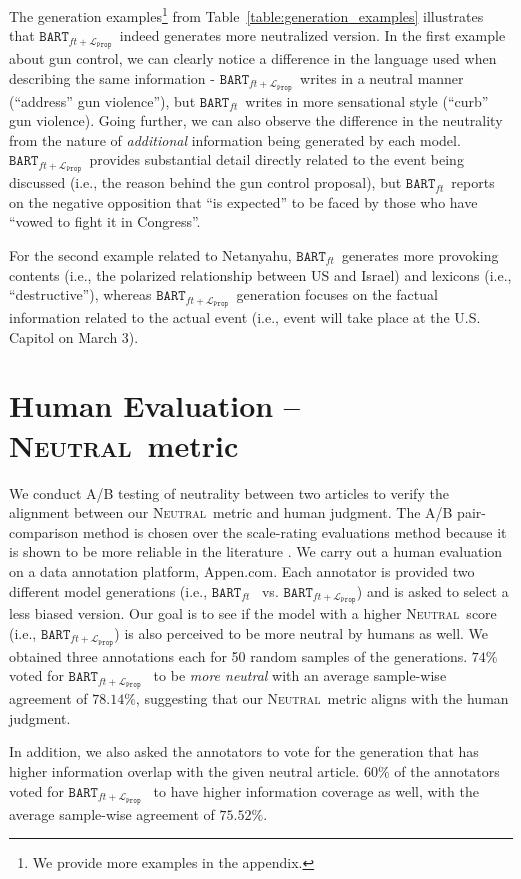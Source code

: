 \documentclass[11pt,a4paper]{article}
\newcommand{\neutral}{\textsc{Neutral}}
\newcommand{\finetune}{$\texttt{BART}_{ft}$}
\newcommand{\prop}{$\texttt{BART}_{ft+\mathcal{L}_\texttt{Prop}}$}
\begin{document}
The generation examples\footnote{We provide more examples in the appendix.} from Table~\ref{table:generation_examples} illustrates that \prop~indeed generates more neutralized version. 
In the first example about gun control, we can clearly notice a difference in the language used when describing the same information - \prop~writes in a neutral manner (``address'' gun violence''), but \finetune~writes in more sensational style (``curb'' gun violence). Going further, we can also observe the difference in the neutrality from the nature of \textit{additional} information being generated by each model. \prop~provides substantial detail directly related to the event being discussed (i.e., the reason behind the gun control proposal), but \finetune~reports on the negative opposition that ``is expected'' to be faced by those who have ``vowed to fight it in Congress''. 

For the second example related to Netanyahu, \finetune~generates more provoking contents (i.e., the polarized relationship between US and Israel) and lexicons (i.e., ``destructive''), whereas \prop~generation focuses on the factual information related to the actual event (i.e., event will take place at the U.S. Capitol on March 3).

\section{Human Evaluation -- \neutral~metric}
We conduct A/B testing of neutrality between two articles to verify the alignment between our \neutral~metric and human judgment. The A/B pair-comparison method is chosen over the scale-rating evaluations method because it is shown to be more reliable in the literature
\cite{kiritchenko-mohammad-2017-best}. 
We carry out a human evaluation on a data annotation platform, Appen.com. Each annotator is provided two different model generations (i.e., \finetune~ vs. \prop) and is asked to select a less biased version. Our goal is to see if the model with a higher \neutral~score (i.e., \prop) is also perceived to be more neutral by humans as well. 
We obtained three annotations each for 50 random samples of the generations. $74\%$ voted for \prop~ to be \textit{more neutral} with an average sample-wise agreement of $78.14\%$, suggesting that our \neutral~metric aligns with the human judgment. 

In addition, we also asked the annotators to vote for the generation that has higher information overlap with the given neutral article. $60\%$ of the annotators voted for \prop~ to have higher information coverage as well, with the average sample-wise agreement of $75.52\%$.
\end{document}
